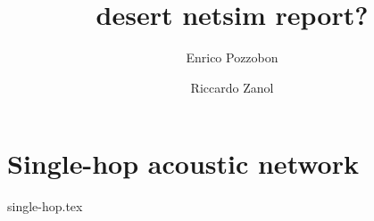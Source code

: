 \documentclass[a4paper,twoside,twocolumn]{article}
\author{Enrico Pozzobon \and Riccardo Zanol}
\title{desert netsim report?}
\begin{document}
\maketitle

\section{Single-hop acoustic network}
{single-hop.tex}

\end{document}
